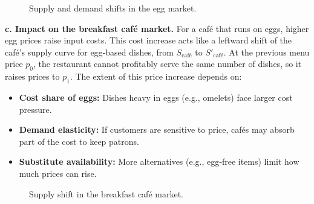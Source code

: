 \documentclass[12pt]{article}
\begin{document}
\begin{doublespace}
\begin{figure}[H]
\centering
{}
\caption{Supply and demand shifts in the egg market.}
\end{figure}

\textbf{c. Impact on the breakfast café market.} For a café that runs on eggs, higher egg prices raise input costs. This cost increase acts like a leftward shift of the café’s supply curve for egg‐based dishes, from $S_{\text{café}}$ to $S'_{\text{café}}$. At the previous menu price $p_0$, the restaurant cannot profitably serve the same number of dishes, so it raises prices to $p_1$. The extent of this price increase depends on:
\begin{itemize}
  \item \textbf{Cost share of eggs:} Dishes heavy in eggs (e.g., omelets) face larger cost pressure.
  \item \textbf{Demand elasticity:} If customers are sensitive to price, cafés may absorb part of the cost to keep patrons.
  \item \textbf{Substitute availability:} More alternatives (e.g., egg‐free items) limit how much prices can rise.
\end{itemize}

\begin{figure}[H]
\centering
{}
\caption{Supply shift in the breakfast café market.}
\end{figure}



\end{doublespace}
\end{document}
